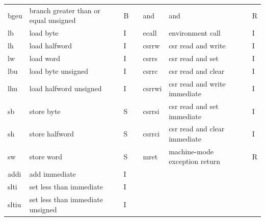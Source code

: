 \documentclass[../main.tex]{subfiles}
\begin{document}
\begin{table}[h]
\begin{tabular}{|l|l|l|llll}
    bgeu  & branch greater than or equal unsigned & B  & \multicolumn{1}{l|}{} & \multicolumn{1}{l|}{and}    & \multicolumn{1}{l|}{and}                           & \multicolumn{1}{l|}{R}  \\
    lb    & load byte                             & I  & \multicolumn{1}{l|}{} & \multicolumn{1}{l|}{ecall}  & \multicolumn{1}{l|}{environment call}              & \multicolumn{1}{l|}{I}  \\
    lh    & load halfword                         & I  & \multicolumn{1}{l|}{} & \multicolumn{1}{l|}{csrrw}  & \multicolumn{1}{l|}{csr read and write}            & \multicolumn{1}{l|}{I}  \\
    lw    & load word                             & I  & \multicolumn{1}{l|}{} & \multicolumn{1}{l|}{csrrs}  & \multicolumn{1}{l|}{csr read and set}              & \multicolumn{1}{l|}{I}  \\
    lbu   & load byte unsigned                    & I  & \multicolumn{1}{l|}{} & \multicolumn{1}{l|}{csrrc}  & \multicolumn{1}{l|}{csr read and clear}            & \multicolumn{1}{l|}{I}  \\
    lhu   & load halfword unsigned                & I  & \multicolumn{1}{l|}{} & \multicolumn{1}{l|}{csrrwi} & \multicolumn{1}{l|}{csr read and write immediate}  & \multicolumn{1}{l|}{I}  \\
    sb    & store byte                            & S  & \multicolumn{1}{l|}{} & \multicolumn{1}{l|}{csrrsi} & \multicolumn{1}{l|}{csr read and set immediate}    & \multicolumn{1}{l|}{I}  \\
    sh    & store halfword                        & S  & \multicolumn{1}{l|}{} & \multicolumn{1}{l|}{csrrci} & \multicolumn{1}{l|}{csr read and clear immediate}  & \multicolumn{1}{l|}{I}  \\
    sw    & store word                            & S  & \multicolumn{1}{l|}{} & \multicolumn{1}{l|}{mret}   & \multicolumn{1}{l|}{machine-mode exception return} & \multicolumn{1}{l|}{R}  \\ \cline{5-7}
    addi  & add immediate                         & I  &                       &                             &                                                    &                         \\
    slti  & set less than immediate               & I  &                       &                             &                                                    &                         \\
    sltiu & set less than immediate unsigned      & I  &                       &                             &                                                    &                         \\

\end{tabular}
\end{table}
\end{document}

